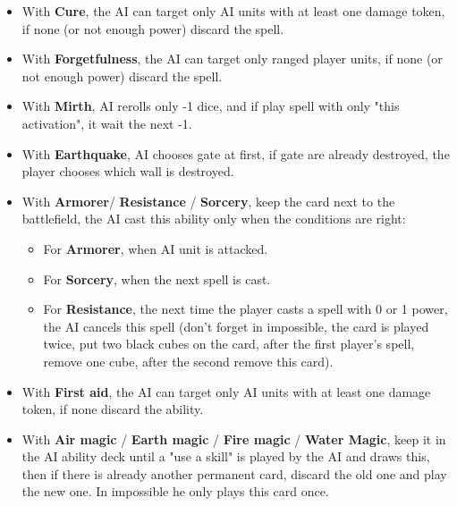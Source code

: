 \begin{multicols}{2}
\begin{itemize}
    \item With \textbf{Cure}, the AI can target only AI units with at least one damage token, if none (or not enough power) discard the spell.
    \item With \textbf{Forgetfulness}, the AI can target only ranged player units, if none (or not enough power) discard the spell. 
    \item With \textbf{Mirth}, AI rerolls only -1 dice, and if play spell with only "this activation", it wait the next -1.
    \item With \textbf{Earthquake}, AI chooses gate at first, if gate are already destroyed, the player chooses which wall is destroyed.
\end{itemize}

\begin{itemize}
    \item With \textbf{Armorer}/ \textbf{Resistance} / \textbf{Sorcery}, keep the card next to the battlefield, the AI cast this ability only when the conditions are right:
    \begin{itemize}
        \item For \textbf{Armorer}, when AI unit is attacked.
        \item For \textbf{Sorcery}, when the next spell is cast.
        \item For \textbf{Resistance}, the next time the player casts a spell with 0 or 1 power, the AI cancels this spell (don’t forget in impossible, the card is played twice, put two black cubes on the card, after the first player's spell, remove one cube, after the second remove this card).
    \end{itemize}
    \item With \textbf{First aid}, the AI can target only AI units with at least one damage token, if none discard the ability. 
    \item With \textbf{Air magic} / \textbf{Earth magic} / \textbf{Fire magic} / \textbf{Water Magic}, keep it in the AI ability deck until a "use a skill" is played by the AI and draws this, then if there is already another permanent card, discard the old one and play the new one. In impossible he only  plays this card once.
\end{itemize}
\end{multicols}


\newpage

